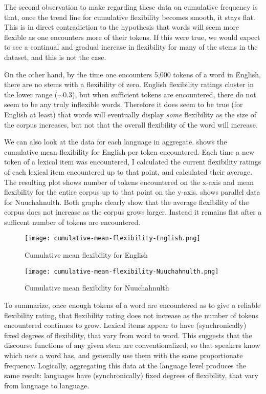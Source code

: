The second observation to make regarding these data on cumulative frequency is that, once the trend line for cumulative flexibility becomes smooth, it stays flat. This is in direct contradiction to the hypothesis that words will seem more flexible as one encounters more of their tokens. If this were true, we would expect to see a continual and gradual increase in flexibility for many of the stems in the dataset, and this is not the case.

On the other hand, by the time one encounters 5,000 tokens of a word in English, there are no stems with a flexibility of zero. English flexibility ratings cluster in the lower range ($\sim0.3$), but when sufficient tokens are encountered, there do not seem to be any truly inflexible words. Therefore it does seem to be true (for English at least) that words will eventually display \emph{some} flexibility as the size of the corpus increases, but not that the overall flexibility of the word will increase.

We can also look at the data for each language in aggregate.  shows the cumulative mean flexibility for English per token encountered. Each time a new token of a lexical item was encountered, I calculated the current flexibility ratings of each lexical item encountered up to that point, and calculated their average. The resulting plot shows number of tokens encountered on the x-axis and mean flexibility for the entire corpus up to that point on the y-axis.  shows parallel data for Nuuchahnulth. Both graphs clearly show that the average flexibility of the corpus does not increase as the corpus grows larger. Instead it remains flat after a sufficent number of tokens are encountered.

\begin{figure}[h!]
  \centering
  \caption{Cumulative mean flexibility for English}
  \label{fig:cumulative-mean-flexibility-English}
  \texttt{[image: cumulative-mean-flexibility-English.png]}
\end{figure}

\begin{figure}[h!]
  \centering
  \caption{Cumulative mean flexibility for Nuuchahnulth}
  \label{fig:cumulative-mean-flexibility-Nuuchahnulth}
  \texttt{[image: cumulative-mean-flexibility-Nuuchahnulth.png]}
\end{figure}

To summarize, once enough tokens of a word are encountered as to give a reliable flexibility rating, that flexibility rating does not increase as the number of tokens encountered continues to grow. Lexical items appear to have (synchronically) fixed degrees of flexibility, that vary from word to word. This suggests that the discourse functions of any given stem are conventionalized, so that speakers know which uses a word has, and generally use them with the same proportionate frequency. Logically, aggregating this data at the language level produces the same result: languages have (synchronically) fixed degrees of flexibility, that vary from language to language.

